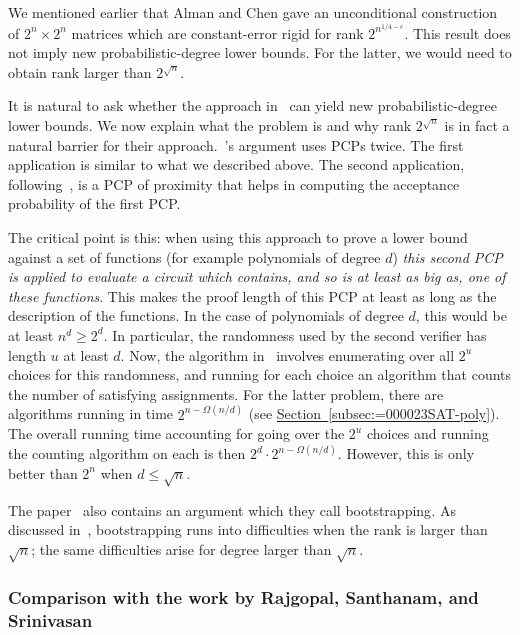 \documentclass[11pt]{article}
\newcommand{\expref}[2]{\texorpdfstring{\hyperref[#2]{#1~\ref{#2}}}{#1~\ref{#2}}}
\newcommand{\e}{\epsilon}
\begin{document}
We mentioned earlier that Alman and Chen %
\cite{AlmanC19} gave   %
an unconditional construction of $2^{n}\times2^{n}$ matrices which are
constant-error rigid for rank $2^{n^{1/4-\e}}$. This result does
not imply new probabilistic-degree lower bounds. For the latter, we
would need to obtain rank larger than $2^{\sqrt{n}}$.

It is natural to ask whether the approach in~\cite{AlmanC19} can
yield new probabilistic-degree lower bounds. We now explain what the
problem is and why rank $2^{\sqrt{n}}$ is in fact a natural barrier
for their approach.~\cite{AlmanC19}'s argument uses PCPs twice. The
first application is similar to what we described above. The second
application, following~\cite{DBLP:conf/coco/ChenW19}, is a PCP of
proximity that helps in computing the acceptance probability of the
first PCP.

The critical point is this: when using this approach to prove a lower
bound against a set of functions (for example polynomials of degree
$d$) \emph{this second PCP is applied to evaluate a circuit which
contains, and so is at least as big as, one of these functions}. This
makes the proof length of this PCP at least as long as the description
of the functions. In the case of polynomials of degree $d$, this
would be at least $n^{d}\ge2^{d}$. In particular, the randomness
used by the second verifier has length $u$ at least $d$. Now, the
algorithm in~\cite{AlmanC19} involves enumerating over all $2^{u}$
choices for this randomness, and running for each choice an algorithm
that counts the number of satisfying assignments. For the latter problem,
there are algorithms running in time $2^{n-\Omega(n/d)}$ 
(see \expref{Section}{subsec:=000023SAT-poly}). The overall
%
%
%
%
running time  %
accounting for
going over the $2^{u}$ choices and running the counting algorithm
on each is then $2^{d}\cdot2^{n-\Omega(n/d)}.$ However, this is only
better than $2^{n}$ when $d\le\sqrt{n}$.

The paper~\cite{AlmanC19} also contains an argument which they call
bootstrapping\emph{.} As discussed in~\cite{AlmanC19}, bootstrapping
runs into difficulties when the rank is larger than $\sqrt{n}$; the
same difficulties arise for degree larger than $\sqrt{n}.$

\subsubsection{Comparison with the work by Rajgopal, Santhanam, and 
Srinivasan~\cite{DBLP:conf/mfcs/RajgopalS018}}
\end{document}
